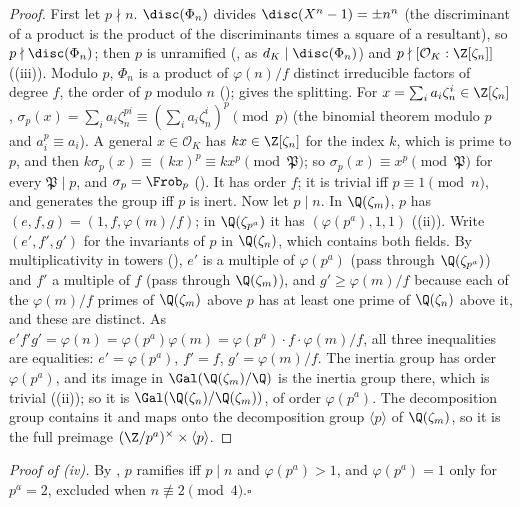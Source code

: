 \begin{proof}
First let $p\nmid n$. $\disc(\Phi_n)$ divides $\disc(X^n-1)=\pm n^n$ (the discriminant of a product is the product of the discriminants times a square of a
resultant), so $p\nmid\disc(\Phi_n)$; then $p$ is unramified (, as $d_K\mid\disc(\Phi_n)$) and $p\nmid[\mathcal O_K:\Z[\zeta_n]]$
((iii)). Modulo $p$, $\Phi_n$ is a product of $\varphi(n)/f$ distinct irreducible factors of degree $f$, the order of $p$ modulo $n$
();  gives the splitting. For $x=\sum_ia_i\zeta_n^i\in\Z[\zeta_n]$,
$\sigma_p(x)=\sum_ia_i\zeta_n^{pi}\equiv(\sum_ia_i\zeta_n^i)^p\pmod{p}$ (the binomial theorem modulo $p$ and $a_i^p\equiv a_i$). A general $x\in\mathcal O_K$ has $kx\in\Z[\zeta_n]$
for the index $k$, which is prime to $p$, and then $k\sigma_p(x)\equiv(kx)^p\equiv kx^p\pmod{\mathfrak P}$; so $\sigma_p(x)\equiv x^p\pmod{\mathfrak P}$ for every
$\mathfrak P\mid p$, and $\sigma_p=\Frob_p$ (). It has order $f$; it is trivial iff $p\equiv1\pmod n$, and generates the group iff $p$ is
inert. Now let $p\mid n$. In $\Q(\zeta_m)$, $p$ has $(e,f,g)=(1,f,\varphi(m)/f)$; in $\Q(\zeta_{p^a})$ it has $(\varphi(p^a),1,1)$ ((ii)).
Write $(e',f',g')$ for the invariants of $p$ in $\Q(\zeta_n)$, which contains both fields. By multiplicativity in towers (), $e'$ is a
multiple of $\varphi(p^a)$ (pass through $\Q(\zeta_{p^a})$) and $f'$ a multiple of $f$ (pass through $\Q(\zeta_m)$), and $g'\ge\varphi(m)/f$ because each of the
$\varphi(m)/f$ primes of $\Q(\zeta_m)$ above $p$ has at least one prime of $\Q(\zeta_n)$ above it, and these are distinct. As
$e'f'g'=\varphi(n)=\varphi(p^a)\varphi(m)=\varphi(p^a)\cdot f\cdot\varphi(m)/f$, all three inequalities are equalities: $e'=\varphi(p^a)$, $f'=f$, $g'=\varphi(m)/f$. The inertia group has order $\varphi(p^a)$, and its image
in $\Gal(\Q(\zeta_m)/\Q)$ is the inertia group there, which is trivial ((ii)); so it is $\Gal(\Q(\zeta_n)/\Q(\zeta_m))$, of order
$\varphi(p^a)$. The decomposition group contains it and maps onto the decomposition group $\langle p\rangle$ of $\Q(\zeta_m)$, so it is the full preimage
$(\Z/p^a)^\times\times\langle p\rangle$.
\end{proof}

\noindent\emph{Proof of (iv).} By , $p$ ramifies iff $p\mid n$ and $\varphi(p^a)>1$, and
$\varphi(p^a)=1$ only for $p^a=2$, excluded when $n\not\equiv2\pmod4$.\hfill$\square$

